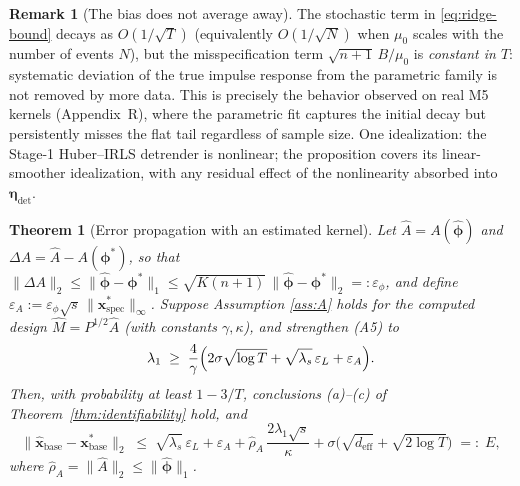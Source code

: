 \documentclass[10pt]{article} %
\theoremstyle{plain}
\newtheorem{theorem}{Theorem}
\theoremstyle{definition}
\newtheorem{remark}{Remark}
\begin{document}
\begin{remark}[The bias does not average away]
The stochastic term in \eqref{eq:ridge-bound} decays as
$O(1/\sqrt{T})$ (equivalently $O(1/\sqrt{N})$ when $\mu_{0}$ scales
with the number of events $N$), but the misspecification term
$\sqrt{n{+}1}\,B/\mu_{0}$ is \emph{constant in $T$}: systematic
deviation of the true impulse response from the parametric family is
not removed by more data. This is precisely the behavior observed on
real M5 kernels (Appendix~R), where the parametric fit captures the
initial decay but persistently misses the flat tail regardless of
sample size. One idealization: the Stage-1 Huber--IRLS detrender is
nonlinear; the proposition covers its linear-smoother idealization,
with any residual effect of the nonlinearity absorbed into
$\boldsymbol{\eta}_{\det}$.
\end{remark}

\begin{theorem}[Error propagation with an estimated kernel]
\label{thm:twostage}
Let $\hat{A}=A(\hat{\boldsymbol{\phi}})$ and
$\Delta A = \hat{A}-A(\boldsymbol{\phi}^{*})$, so that
$\|\Delta A\|_{2} \le
\|\hat{\boldsymbol{\phi}}-\boldsymbol{\phi}^{*}\|_{1}
\le \sqrt{K(n{+}1)}\,
\|\hat{\boldsymbol{\phi}}-\boldsymbol{\phi}^{*}\|_{2}
=: \varepsilon_{\phi}$, and define
$\varepsilon_{A} := \varepsilon_{\phi}\sqrt{s}\,
\|\mathbf{x}^{*}_{\mathrm{spec}}\|_{\infty}$. Suppose Assumption
\ref{ass:A} holds for the \emph{computed} design
$\hat{M}=P^{1/2}\hat{A}$ (with constants $\gamma,\kappa$), and
strengthen (A5) to
\begin{equation}
\lambda_{1}\;\ge\;\frac{4}{\gamma}\Bigl(2\sigma\sqrt{\log T}
+ \sqrt{\lambda_{s}}\,\varepsilon_{L} + \varepsilon_{A}\Bigr).
\label{eq:A5prime}
\end{equation}
Then, with probability at least $1-3/T$, conclusions (a)--(c) of
Theorem~\ref{thm:identifiability} hold, and
\begin{equation}
\|\hat{\mathbf{x}}_{\mathrm{base}}-\mathbf{x}^{*}_{\mathrm{base}}\|_{2}
\;\le\;
\sqrt{\lambda_{s}}\,\varepsilon_{L}
+ \varepsilon_{A}
+ \hat{\rho}_{A}\,\frac{2\lambda_{1}\sqrt{s}}{\kappa}
+ \sigma\bigl(\sqrt{d_{\mathrm{eff}}}+\sqrt{2\log T}\bigr)
\;=:\; E,
\label{eq:E-def}
\end{equation}
where $\hat{\rho}_{A}=\|\hat{A}\|_{2}
\le\|\hat{\boldsymbol{\phi}}\|_{1}$.
\end{theorem}
\end{document}
